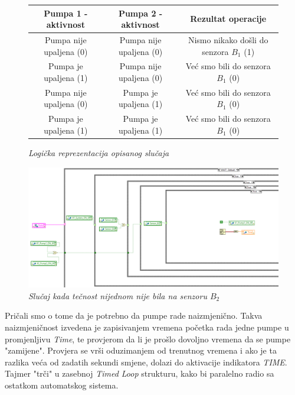 \documentclass[12pt, titlepage]{article}
\begin{document}
                \begin{figure}[ht]
                    \centering
                    \begin{tabular}{|c|c|c|}
                        \hline
                        \textbf{Pumpa 1 - aktivnost} & \textbf{Pumpa 2 - aktivnost} & \textbf{Rezultat operacije} \\
                        \hline
                        Pumpa nije upaljena (0) & Pumpa nije upaljena (0) & Nismo nikako došli do senzora $B_1$ (1) \\
                        \hline
                        Pumpa je upaljena (1) & Pumpa nije upaljena (0) & Već smo bili do senzora $B_1$ (0) \\
                        \hline
                        Pumpa nije upaljena (0) & Pumpa je upaljena (1) & Već smo bili do senzora $B_1$ (0) \\
                        \hline
                        Pumpa je upaljena (1) & Pumpa je upaljena (1) & Već smo bili do senzora $B_1$ (0) \\
                        \hline
                    \end{tabular}
                    \caption{\textit{Logička reprezentacija opisanog slučaja}}
                \end{figure}

                \begin{figure}[ht]
                    \centering
                    \includegraphics[width=\textwidth]{Slike/HAND_AUTO.vi AUTO WAIT NOSENSORB2.png}
                    \caption{\textit{Slučaj kada tečnost nijednom nije bila na senzoru $B_2$}}
                \end{figure}

                Pričali smo o tome da je potrebno da pumpe rade naizmjenično. Takva naizmjeničnost izvedena je 
                zapisivanjem vremena početka rada jedne pumpe u promjenljivu \textit{Time}, te provjerom da li je prošlo dovoljno vremena
                da se pumpe "zamijene". Provjera se vrši oduzimanjem od trenutnog vremena i ako je ta razlika 
                veća od zadatih sekundi smjene, dolazi do aktivacije indikatora \textit{TIME}. Tajmer "trči" 
                u zasebnoj \textit{Timed Loop} strukturu, kako bi paralelno radio sa ostatkom automatskog sistema.
\end{document}
